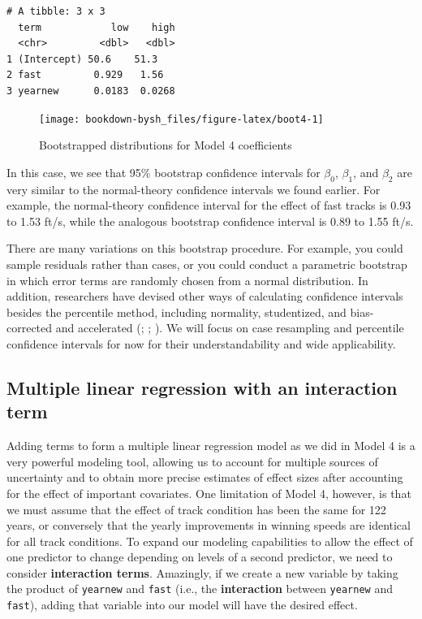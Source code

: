 \documentclass[
]{krantz}
\begin{document}
\begin{verbatim}
# A tibble: 3 x 3
  term            low    high
  <chr>         <dbl>   <dbl>
1 (Intercept) 50.6    51.3   
2 fast         0.929   1.56  
3 yearnew      0.0183  0.0268
\end{verbatim}

\begin{figure}

{\centering \texttt{[image: bookdown-bysh\_files/figure-latex/boot4-1]} 

}

\caption{Bootstrapped distributions for Model 4 coefficients}\label{fig:boot4}
\end{figure}

In this case, we see that 95\% bootstrap confidence intervals for \(\beta_0\), \(\beta_1\), and \(\beta_2\) are very similar to the normal-theory confidence intervals we found earlier. For example, the normal-theory confidence interval for the effect of fast tracks is 0.93 to 1.53 ft/s, while the analogous bootstrap confidence interval is 0.89 to 1.55 ft/s.

There are many variations on this bootstrap procedure. For example, you could sample residuals rather than cases, or you could conduct a parametric bootstrap in which error terms are randomly chosen from a normal distribution. In addition, researchers have devised other ways of calculating confidence intervals besides the percentile method, including normality, studentized, and bias-corrected and accelerated (\citet{Hesterberg2015}; \citet{Efron1993}; \citet{Davison1997}). We will focus on case resampling and percentile confidence intervals for now for their understandability and wide applicability.

\hypertarget{multiple-linear-regression-with-an-interaction-term}{%
\subsection{Multiple linear regression with an interaction term}\label{multiple-linear-regression-with-an-interaction-term}}

Adding terms to form a multiple linear regression model as we did in Model 4 is a very powerful modeling tool, allowing us to account for multiple sources of uncertainty and to obtain more precise estimates of effect sizes after accounting for the effect of important covariates. One limitation of Model 4, however, is that we must assume that the effect of track condition has been the same for 122 years, or conversely that the yearly improvements in winning speeds are identical for all track conditions. To expand our modeling capabilities to allow the effect of one predictor to change depending on levels of a second predictor, we need to consider \textbf{interaction terms}. Amazingly, if we create a new variable by taking the product of \texttt{yearnew} and \texttt{fast} (i.e., the \textbf{interaction} between \texttt{yearnew} and \texttt{fast}), adding that variable into our model will have the desired effect.
\end{document}
